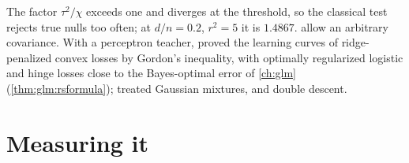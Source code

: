 \begin{refsection}
The factor $\tau^2/\chi$ exceeds one and diverges at the threshold, so the classical test rejects true nulls too often; at $d/n=0.2$, $r^2=5$ it is $1.4867$. \Textcite{ZhaoSurCandes2022} allow an arbitrary covariance. With a perceptron teacher, \textcite{AubinEtAl2020} proved the learning curves of ridge-penalized convex losses by Gordon's inequality, with optimally regularized logistic and hinge losses close to the Bayes-optimal error of \cref{ch:glm} (\cref{thm:glm:rsformula}); \textcite{MignaccoEtAl2020} treated Gaussian mixtures, and \textcite{DengKammounThrampoulidis2022} double descent.

\section{Measuring it}\label{sec:classification:measuring}


\end{refsection}
